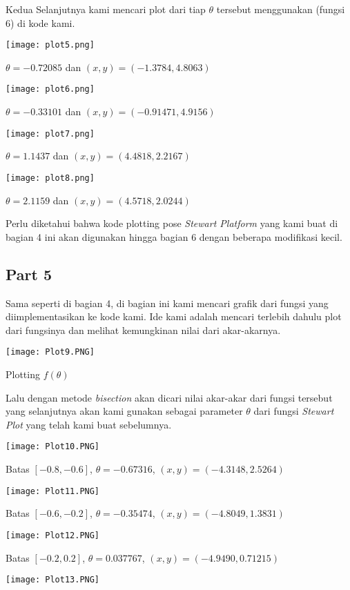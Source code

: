 \documentclass[11pt]{article}
\begin{document}
\begin{multicols}{2}
Kedua Selanjutnya kami mencari plot dari tiap $\theta$ tersebut menggunakan (fungsi 6) di kode kami.

\texttt{[image: plot5.png]}

\centerline{$\theta = -0.72085$ dan $(x,y) = (-1.3784, 4.8063)$}

\texttt{[image: plot6.png]}

\centerline{$\theta = -0.33101$ dan $(x,y) = (-0.91471, 4.9156)$}

\texttt{[image: plot7.png]}

\centerline{$\theta = 1.1437$ dan $(x,y) = (4.4818, 2.2167)$}

\texttt{[image: plot8.png]}

\centerline{$\theta = 2.1159$ dan $(x,y) = (4.5718, 2.0244)$}

\medskip

Perlu diketahui bahwa kode plotting pose \textit{Stewart Platform} yang kami buat di bagian 4 ini akan digunakan hingga bagian 6 dengan beberapa modifikasi kecil.

\subsection{Part 5}
Sama seperti di bagian 4, di bagian ini kami mencari grafik dari fungsi yang diimplementasikan ke kode kami. Ide kami adalah mencari terlebih dahulu plot dari fungsinya dan melihat kemungkinan nilai dari akar-akarnya.

\texttt{[image: Plot9.PNG]}
\centerline{Plotting $f(\theta)$}

\medskip

Lalu dengan metode \textit{bisection} akan dicari nilai akar-akar dari fungsi tersebut yang selanjutnya akan kami gunakan sebagai parameter $\theta$ dari fungsi \textit{Stewart Plot} yang telah kami buat sebelumnya.

\texttt{[image: Plot10.PNG]}

Batas $[-0.8,-0.6]$, $\theta=-0.67316$, $(x,y)=(-4.3148,2.5264)$

\texttt{[image: Plot11.PNG]}

Batas $[-0.6,-0.2]$, $\theta=-0.35474$, $(x,y)=(-4.8049,1.3831)$

\texttt{[image: Plot12.PNG]}

Batas $[-0.2, 0.2]$, $\theta=0.037767$, $(x,y)=(-4.9490,0.71215)$

\texttt{[image: Plot13.PNG]}


\end{multicols}
\end{document}
